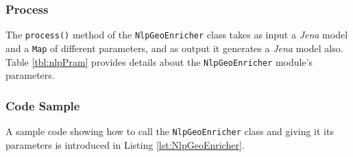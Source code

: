 \documentclass[a4paper,twoside,bibtotoc,abstracton,12pt,BCOR=15mm]{article}
\begin{document}
\subsubsection{Process}
The \texttt{process()} method of the \texttt{NlpGeoEnricher} class takes as input a \emph{Jena} model and a \texttt{Map} of different parameters, 
and as output it generates a \emph{Jena} model also.
Table \ref{tbl:nlpPram} provides details about the \texttt{NlpGeoEnricher} module's parameters.

\subsubsection{Code Sample}
A sample code showing how to call the \texttt{NlpGeoEnricher} class and giving it its parameters is introduced in Listing \ref{lst:NlpGeoEnricher}.
\end{document}
